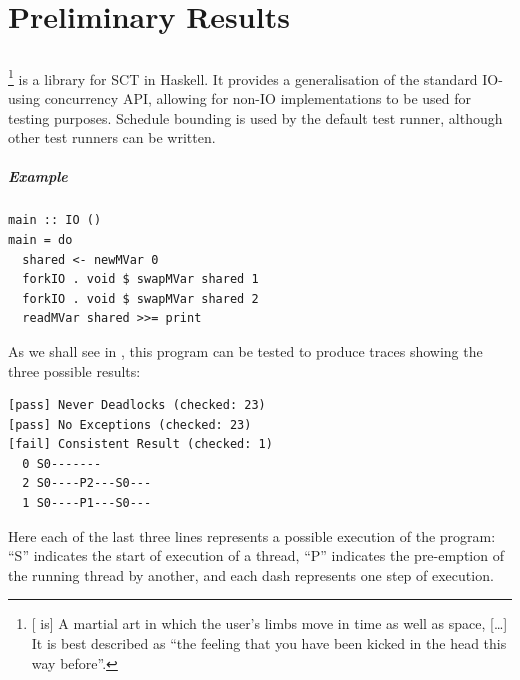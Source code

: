 \chapter{Preliminary Results}
\label{sec:prelims}



\section{\dejafu{}}
\label{sec:prelims-dejafu}

\dejafu{}\footnote{[\dejafu{} is] A martial art in which the user's
  limbs move in time as well as space, [\ldots{}] It is best described
  as ``the feeling that you have been kicked in the head this way
  before''. } is a library for
SCT in Haskell. It provides a generalisation of the standard IO-using
concurrency API, allowing for non-IO implementations to be used for
testing purposes. Schedule bounding\cite{pbound} is used by the
default test runner, although other test runners can be written.

\begin{justspacing}
\paragraph{Example}

\begin{verbatim}
main :: IO ()
main = do
  shared <- newMVar 0
  forkIO . void $ swapMVar shared 1
  forkIO . void $ swapMVar shared 2
  readMVar shared >>= print
\end{verbatim}

As we shall see in , this program can be
tested to produce traces showing the three possible results:

\begin{verbatim}
[pass] Never Deadlocks (checked: 23)
[pass] No Exceptions (checked: 23)
[fail] Consistent Result (checked: 1)
  0 S0-------
  2 S0----P2---S0---
  1 S0----P1---S0---
\end{verbatim}

Here each of the last three lines represents a possible execution of
the program: ``S'' indicates the start of execution of a thread, ``P''
indicates the pre-emption of the running thread by another, and each
dash represents one step of execution.
\end{justspacing}

